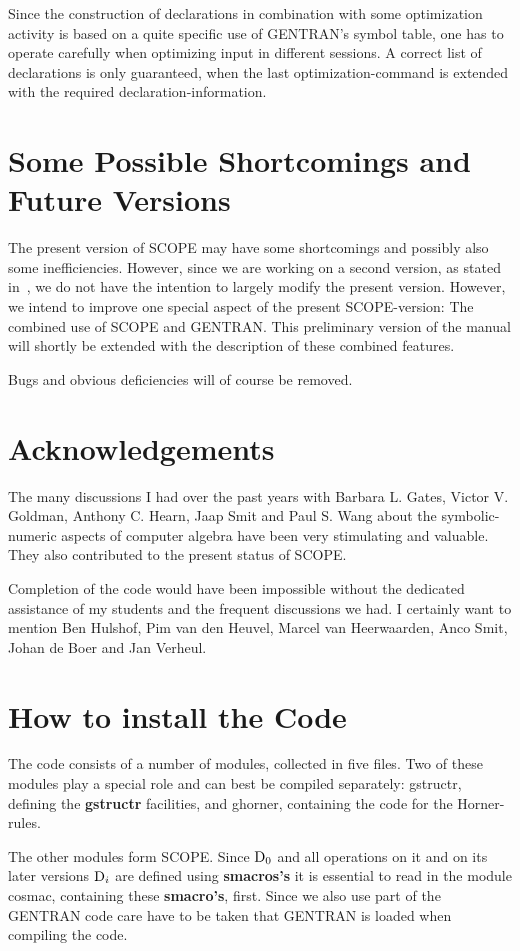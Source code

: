 Since the construction of declarations in combination with some
optimization activity is based on a quite specific use of GENTRAN's
symbol table, one has to operate carefully when optimizing input in
different sessions. A correct list of declarations is only guaranteed,
when the last optimization-command is extended with the required
declaration-information.

\section{Some Possible Shortcomings and Future Versions}\label{SCOPE:future}

The present version of SCOPE may have some shortcomings and possibly also
some inefficiencies.  However, since we are working on a second version,
as stated in~\cite{vanHulzen:90}, we do not have the intention to largely
modify the present version.  However, we intend to improve one special
aspect of the present SCOPE-version:  The combined use of SCOPE and
GENTRAN.  This preliminary version of the manual will shortly be extended
with the description of these combined features.

Bugs and obvious deficiencies will of course be removed.

\section*{Acknowledgements}

The many discussions I had over the past years with Barbara L. Gates,
Victor V. Goldman, Anthony C. Hearn, Jaap Smit and Paul S. Wang about
the symbolic-numeric aspects of computer algebra have been very
stimulating and valuable. They also contributed to the present status
of SCOPE.

Completion of the code would have been impossible without the dedicated
assistance of my students and the frequent discussions we had.
I certainly want to mention Ben Hulshof, Pim van den Heuvel, Marcel van
Heerwaarden, Anco Smit, Johan de Boer and Jan Verheul.

\section*{How to install the Code}\label{SCOPE:install}
The code consists of a number of modules, collected in five files. Two of
these modules play a special role and can best be compiled separately:
gstructr, defining the {\bf gstructr} facilities, and ghorner, containing
the code for the Horner-rules.

The other modules form SCOPE. Since ${{\rm D}}_{0}$ and all operations
on it and on its later versions ${{\rm D}}_{i}$ are defined using {\bf
smacros's} it is essential to read in the module cosmac, containing
these {\bf smacro's}, first. Since we also use part of the GENTRAN
code care have to be taken that GENTRAN is loaded when compiling the
code.




